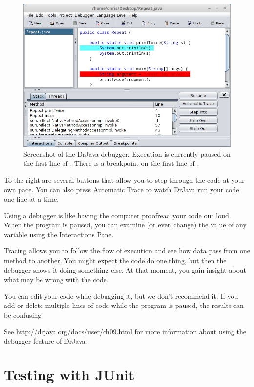 \begin{figure}[!ht]
\begin{center}
\includegraphics[width=\textwidth]{figs/debugger.png}
\caption{Screenshot of the DrJava debugger.
Execution is currently paused on the first line of .
There is a breakpoint on the first line of .}
\label{fig.debugger}
\end{center}
\end{figure}

To the right are several buttons that allow you to step through the code at your own pace.
You can also press {\sf Automatic Trace} to watch DrJava run your code one line at a time.

Using a debugger is like having the computer proofread your code out loud.
When the program is paused, you can examine (or even change) the value of any variable using the Interactions Pane.

Tracing allows you to follow the flow of execution and see how data pass from one method to another.
You might expect the code do one thing, but then the debugger shows it doing something else.
At that moment, you gain insight about what may be wrong with the code.

You can edit your code while debugging it, but we don't recommend it.
If you add or delete multiple lines of code while the program is paused, the results can be confusing.

See \url{http://drjava.org/docs/user/ch09.html} for more information about using the debugger feature of DrJava.


\section{Testing with JUnit}
\label{JUnit}

